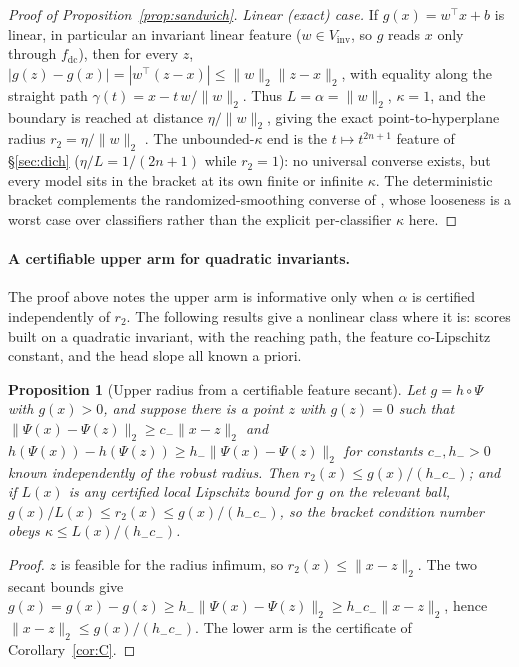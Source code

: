 \documentclass{article}
\newtheorem{proposition}{Proposition}
\theoremstyle{definition}
\newcommand{\fdc}{f_{\mathrm{dc}}}
\newcommand{\Vinv}{V_{\mathrm{inv}}}
\begin{document}
\begin{proof}[Proof of Proposition~\ref{prop:sandwich}]
\emph{Linear (exact) case.}
If $g(x)=w^\top x+b$ is linear, in particular an invariant linear feature ($w\in\Vinv$, so
$g$ reads $x$ only through $\fdc$), then for every $z$,
$|g(z)-g(x)|=|w^\top(z-x)|\le\|w\|_2\|z-x\|_2$, with equality along the straight path
$\gamma(t)=x-t\,w/\|w\|_2$. Thus $L=\alpha=\|w\|_2$, $\kappa=1$, and the boundary is reached
at distance $\eta/\|w\|_2$, giving the exact point-to-hyperplane radius
$r_2=\eta/\|w\|_2$ \citep{hein2017formal}. The unbounded-$\kappa$ end is the
$t\mapsto t^{2n+1}$ feature of \S\ref{sec:dich} ($\eta/L=1/(2n+1)$ while $r_2=1$): no
universal converse exists, but every model sits in the bracket at its own finite or
infinite $\kappa$. The deterministic bracket complements the randomized-smoothing converse
of \citet{cohen2019certified}, whose looseness is a worst case over classifiers rather than
the explicit per-classifier $\kappa$ here.
\end{proof}

\paragraph{A certifiable upper arm for quadratic invariants.} The proof above notes the upper arm is informative only when $\alpha$ is certified independently of $r_2$. The following results give a nonlinear class where it is: scores built on a quadratic invariant, with the reaching path, the feature co-Lipschitz constant, and the head slope all known a priori.

\begin{proposition}[Upper radius from a certifiable feature secant]\label{prop:secant-upper}
Let $g=h\circ\Psi$ with $g(x)>0$, and suppose there is a point $z$ with $g(z)=0$ such that $\|\Psi(x)-\Psi(z)\|_2\ge c_-\|x-z\|_2$ and $h(\Psi(x))-h(\Psi(z))\ge h_-\|\Psi(x)-\Psi(z)\|_2$ for constants $c_-,h_->0$ known independently of the robust radius. Then $r_2(x)\le g(x)/(h_-c_-)$; and if $L(x)$ is any certified local Lipschitz bound for $g$ on the relevant ball, $g(x)/L(x)\le r_2(x)\le g(x)/(h_-c_-)$, so the bracket condition number obeys $\kappa\le L(x)/(h_-c_-)$.
\end{proposition}
\begin{proof}
$z$ is feasible for the radius infimum, so $r_2(x)\le\|x-z\|_2$. The two secant bounds give $g(x)=g(x)-g(z)\ge h_-\|\Psi(x)-\Psi(z)\|_2\ge h_-c_-\|x-z\|_2$, hence $\|x-z\|_2\le g(x)/(h_-c_-)$. The lower arm is the certificate of Corollary~\ref{cor:C}.
\end{proof}
\end{document}

